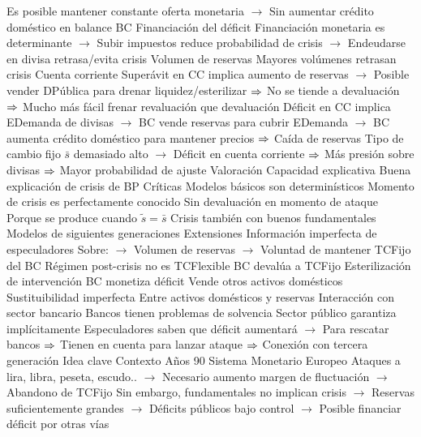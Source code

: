 \documentclass{nuevotema}
\begin{document}
\begin{esquemal}
				\4[] Es posible mantener constante oferta monetaria
				\4[] $\to$ Sin aumentar crédito doméstico en balance BC
				\4 Financiación del déficit
				\4[] Financiación monetaria es determinante
				\4[] $\to$ Subir impuestos reduce probabilidad de crisis
				\4[] $\to$ Endeudarse en divisa retrasa/evita crisis
				\4 Volumen de reservas
				\4[] Mayores volúmenes retrasan crisis
				\4 Cuenta corriente
				\4[] Superávit en CC implica aumento de reservas
				\4[] $\to$ Posible vender DPública para drenar liquidez/esterilizar
				\4[] $\Rightarrow$ No se tiende a devaluación
				\4[] $\Rightarrow$ Mucho más fácil frenar revaluación que devaluación
				\4[] Déficit en CC implica EDemanda de divisas
				\4[] $\to$ BC vende reservas para cubrir EDemanda
				\4[] $\to$ BC aumenta crédito doméstico para mantener precios
				\4[] $\Rightarrow$ Caída de reservas
				\4 Tipo de cambio fijo
				\4[] $\bar{s}$ demasiado alto
				\4[] $\to$ Déficit en cuenta corriente
				\4[] $\Rightarrow$ Más presión sobre divisas
				\4[] $\Rightarrow$ Mayor probabilidad de ajuste
		\2 Valoración
			\3 Capacidad explicativa
				\4 Buena explicación de crisis de BP
			\3 Críticas
				\4 Modelos básicos son determinísticos
				\4[] Momento de crisis es perfectamente conocido
				\4 Sin devaluación en momento de ataque
				\4[] Porque se produce cuando $\tilde{s}=\bar{s}$
				\4 Crisis también con buenos fundamentales
				\4[] Modelos de siguientes generaciones
			\3 Extensiones
				\4 Información imperfecta de especuladores
				\4[] Sobre:
				\4[] $\to$ Volumen de reservas
				\4[] $\to$ Voluntad de mantener TCFijo del BC
				\4 Régimen post-crisis no es TCFlexible
				\4[] BC devalúa a TCFijo
				\4 Esterilización de intervención
				\4[] BC monetiza déficit
				\4[] Vende otros activos domésticos
				\4 Sustituibilidad imperfecta
				\4[] Entre activos domésticos y reservas
				\4 Interacción con sector bancario
				\4[] Bancos tienen problemas de solvencia
				\4[] Sector público garantiza implícitamente
				\4[] Especuladores saben que déficit aumentará
				\4[] $\to$ Para rescatar bancos
				\4[] $\Rightarrow$ Tienen en cuenta para lanzar ataque
				\4[] $\Rightarrow$ Conexión con tercera generación
	\1 
		\2 Idea clave
			\3 Contexto
				\4 Años 90
				\4[] Sistema Monetario Europeo
				\4[] Ataques a lira, libra, peseta, escudo..
				\4[] $\to$ Necesario aumento margen de fluctuación
				\4[] $\to$ Abandono de TCFijo
				\4[] Sin embargo, fundamentales no implican crisis
				\4[] $\to$ Reservas suficientemente grandes
				\4[] $\to$ Déficits públicos bajo control
				\4[] $\to$ Posible financiar déficit por otras vías

\end{esquemal}
\end{document}
